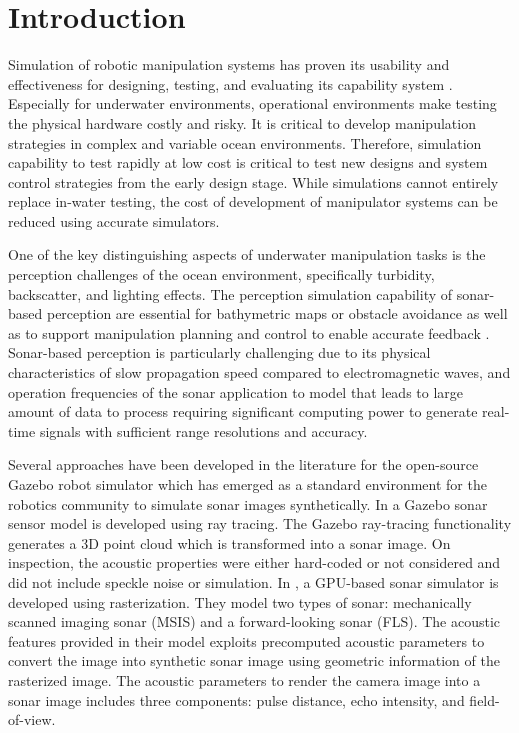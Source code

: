 \documentclass[utf8]{frontiersSCNS} %
\begin{document}
\section{Introduction}
Simulation of robotic manipulation systems has proven its usability and effectiveness for designing, testing, and evaluating its capability system \citep{cook2014survey}. Especially for underwater environments, operational environments make testing the physical hardware costly and risky. It is critical to develop manipulation strategies in complex and variable ocean environments. Therefore, simulation capability to test rapidly at low cost is critical to test new designs and system control strategies from the early design stage. While simulations cannot entirely replace in-water testing, the cost of development of manipulator systems can be reduced using accurate simulators.

One of the key distinguishing aspects of underwater manipulation tasks is the perception challenges of the ocean environment, specifically turbidity, backscatter, and lighting effects. The perception simulation capability of sonar-based perception are essential for bathymetric maps or obstacle avoidance as well as to support manipulation planning and control to enable accurate feedback \citep{manhaes2016uuv}. Sonar-based perception is particularly challenging due to its physical characteristics of slow propagation speed compared to electromagnetic waves, and operation frequencies of the sonar application to model that leads to large amount of data to process requiring significant computing power to generate real-time signals with sufficient range resolutions and accuracy.

Several approaches have been developed in the literature for the open-source Gazebo robot simulator \citep{koenig04gazebo} which has emerged as a standard environment for the robotics community to simulate sonar images synthetically. In \cite{demarco15computationally} a Gazebo sonar sensor model is developed using ray tracing. The Gazebo ray-tracing functionality generates a 3D point cloud which is transformed into a sonar image. On inspection, the acoustic properties were either hard-coded or not considered and did not include speckle noise or simulation. In \cite{cerqueira17novel, cerqueira20rasterized}, a GPU-based sonar simulator is developed using rasterization. They model two types of sonar: mechanically scanned imaging sonar (MSIS) and a forward-looking sonar (FLS). The acoustic features provided in their model exploits precomputed acoustic parameters to convert the image into synthetic sonar image using geometric information of the rasterized image. The acoustic parameters to render the camera image into a sonar image includes three components: pulse distance, echo intensity, and field-of-view. 
\end{document}
